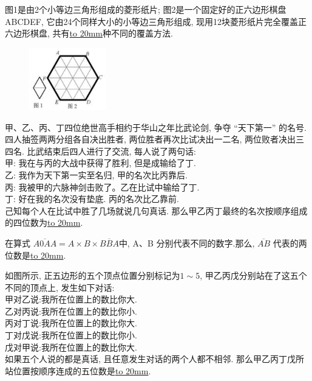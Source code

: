 \item {
    图1是由2个小等边三角形组成的菱形纸片; 图2是一个固定好的正六边形棋盘ABCDEF, 它由24个同样大小的小等边三角形组成, 现用12块菱形纸片完全覆盖正六边形棋盘, 共有\underline{\hbox to 20mm{}}种不同的覆盖方法.
    \begin{figure}[H] 
        \centering
        \includegraphics[width=0.3\textwidth]{./pics/Chapter_7/2015_2.png}
    \end{figure}
    \vspace{1cm}
}

\item {
    甲、乙、丙、丁四位绝世高手相约于华山之年比武论剑, 争夺 ``天下第一'' 的名号. 四人抽签两两分组各自决出胜者, 两位胜者再次比试决出一二名, 两位败者决出三四名. 比武结束后四人进行了交流, 每人说了两句话:\\
    甲: 我在与丙的大战中获得了胜利, 但是成输给了丁.\\
    乙: 我作为天下第一实至名归, 甲的名次比丙靠后.\\
    丙: 我被甲的六脉神剑击败了。乙在比试中输给了丁.\\
    丁: 好在我的名次没有垫底. 丙的名次比乙靠前.\\
    己知每个人在比试中胜了几场就说几句真话. 那么甲乙丙丁最终的名次按顺序组成的四位数为\underline{\hbox to 20mm{}}.
    \vspace{1cm}
}

\item {
    在算式 $\overline{A0AA}= A\times B\times \overline{BBA}$中, A、B 分别代表不同的数字.那么,  $\overline{AB}$ 代表的两位数是\underline{\hbox to 20mm{}}.
    \vspace{1cm}
}

\item {
    如图所示, 正五边形的五个顶点位置分别标记为$1\sim 5$, 甲乙丙戊分别站在了这五个不同的顶点上, 发生如下对话:\\
    甲对乙说:我所在位置上的数比你大. \\
    乙对丙说:我所在位置上的数比你小. \\
    丙对丁说:我所在位置上的数比你大. \\
    丁对戊说:我所在位置上的数比你小. \\
    戊对甲说:我所在位置上的数比你大. \\
    如果五个人说的都是真话, 且任意发生对话的两个人都不相邻. 那么甲乙丙丁戊所站位置按顺序连成的五位数是\underline{\hbox to 20mm{}}.
    \vspace{1cm}
}

